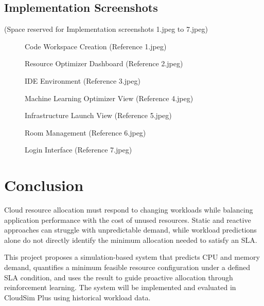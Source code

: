 \documentclass[12pt,a4paper]{report}
\begin{document}
\section{Implementation Screenshots}
(Space reserved for Implementation screenshots 1.jpeg to 7.jpeg)
\vspace{6cm}
\begin{figure}[h]
    \centering
    \caption{Code Workspace Creation (Reference 1.jpeg)}
\end{figure}
\vspace{6cm}
\begin{figure}[h]
    \centering
    \caption{Resource Optimizer Dashboard (Reference 2.jpeg)}
\end{figure}
\vspace{6cm}
\begin{figure}[h]
    \centering
    \caption{IDE Environment (Reference 3.jpeg)}
\end{figure}
\vspace{6cm}
\begin{figure}[h]
    \centering
    \caption{Machine Learning Optimizer View (Reference 4.jpeg)}
\end{figure}
\vspace{6cm}
\begin{figure}[h]
    \centering
    \caption{Infrastructure Launch View (Reference 5.jpeg)}
\end{figure}
\vspace{6cm}
\begin{figure}[h]
    \centering
    \caption{Room Management (Reference 6.jpeg)}
\end{figure}
\vspace{6cm}
\begin{figure}[h]
    \centering
    \caption{Login Interface (Reference 7.jpeg)}
\end{figure}
\lipsum[96-105]

\chapter{Conclusion}
Cloud resource allocation must respond to changing workloads while balancing application performance with the cost of unused resources. Static and reactive approaches can struggle with unpredictable demand, while workload predictions alone do not directly identify the minimum allocation needed to satisfy an SLA.

This project proposes a simulation-based system that predicts CPU and memory demand, quantifies a minimum feasible resource configuration under a defined SLA condition, and uses the result to guide proactive allocation through reinforcement learning. The system will be implemented and evaluated in CloudSim Plus using historical workload data.
\end{document}
